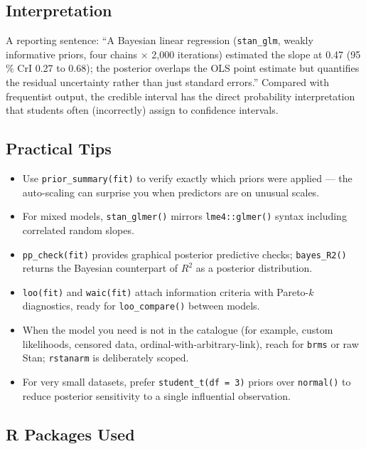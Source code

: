 \documentclass[
]{article}
\providecommand{\tightlist}{%
  \setlength{\itemsep}{0pt}\setlength{\parskip}{0pt}}
\begin{document}
\subsection{Interpretation}\label{interpretation}

A reporting sentence: ``A Bayesian linear regression
(\texttt{stan\_glm}, weakly informative priors, four chains × 2,000
iterations) estimated the slope at 0.47 (95 \% CrI 0.27 to 0.68); the
posterior overlaps the OLS point estimate but quantifies the residual
uncertainty rather than just standard errors.'' Compared with
frequentist output, the credible interval has the direct probability
interpretation that students often (incorrectly) assign to confidence
intervals.

\subsection{Practical Tips}\label{practical-tips}

\begin{itemize}
\tightlist
\item
  Use \texttt{prior\_summary(fit)} to verify exactly which priors were
  applied --- the auto-scaling can surprise you when predictors are on
  unusual scales.
\item
  For mixed models, \texttt{stan\_glmer()} mirrors
  \texttt{lme4::glmer()} syntax including correlated random slopes.
\item
  \texttt{pp\_check(fit)} provides graphical posterior predictive
  checks; \texttt{bayes\_R2()} returns the Bayesian counterpart of
  \(R^2\) as a posterior distribution.
\item
  \texttt{loo(fit)} and \texttt{waic(fit)} attach information criteria
  with Pareto-\(k\) diagnostics, ready for \texttt{loo\_compare()}
  between models.
\item
  When the model you need is not in the catalogue (for example, custom
  likelihoods, censored data, ordinal-with-arbitrary-link), reach for
  \texttt{brms} or raw Stan; \texttt{rstanarm} is deliberately scoped.
\item
  For very small datasets, prefer \texttt{student\_t(df\ =\ 3)} priors
  over \texttt{normal()} to reduce posterior sensitivity to a single
  influential observation.
\end{itemize}

\subsection{R Packages Used}\label{r-packages-used}
\end{document}
